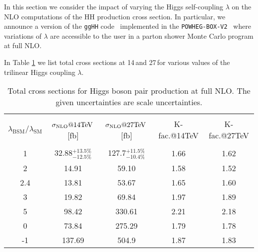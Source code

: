 \label{subsec:varylambda}

In this section we consider the impact of varying the Higgs self-coupling $\lambda$ on the NLO computations of the HH production cross section.
In particular, we announce a version of the {\tt ggHH} code~\cite{Borowka:2016ypz,Heinrich:2017kxx,Borowka:2016ehy} implemented in the {\tt POWHEG-BOX-V2}~\cite{Alioli:2010xd} where variations of  $\lambda$ are accessible to the user in a parton shower Monte Carlo program at full NLO.


In Table \ref{tab:sigmatot} we list total cross sections at 14\,\UTeV and 27\,\UTeV for various values of the trilinear Higgs coupling $\lambda$. 
\begin{table}[htb]
\begin{center}
\begin{tabular}{| c | c | c |c|c|}
\hline
&&&&\\
$\lambda_{\mathrm{BSM}}/\lambda_{\mathrm{SM}}$ & $\sigma_{\rm{NLO}}@14 \mathrm{\text{TeV}}$\,[fb] & $\sigma_{\rm{NLO}}@27 \mathrm{\text{TeV}}$\,[fb] &K-fac.@14TeV&K-fac.@27TeV\\
&&&&\\
\hline
1& 32.88$^{+13.5\%}_{-12.5\%}$&127.7$^{+11.5\%}_{-10.4\%}$ &1.66&1.62\\
\hline
2 & 14.91 &  59.10 & 1.58 & 1.52\\
\hline
2.4 & 13.81& 53.67 & 1.65 & 1.60\\
\hline
3& 19.82 & 69.84 & 1.97 & 1.89\\
\hline 
5 & 98.42& 330.61 & 2.21 & 2.18\\
\hline 
0 & 73.84& 275.29& 1.79 & 1.78 \\
\hline 
-1 & 137.69& 504.9 & 1.87 & 1.83\\
\hline
\end{tabular}
\end{center}
\caption{Total cross sections for Higgs boson pair production at full NLO. The given uncertainties are scale uncertainties. 
\label{tab:sigmatot}}
\end{table}

